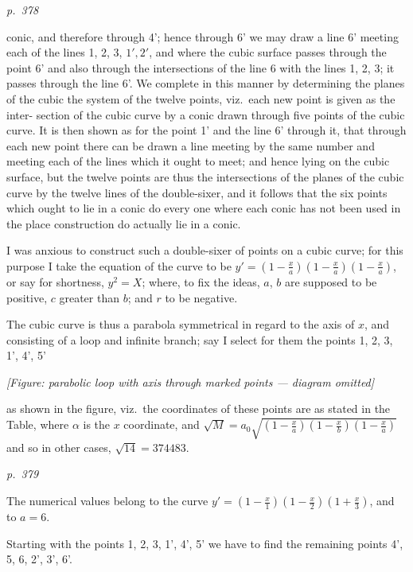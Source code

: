\documentclass[11pt,a4paper]{book}
\begin{document}
\bigskip
\textit{p.~378}
\smallskip

\noindent
conic, and therefore through 4'; hence through 6' we may draw a line 6' meeting
each of the lines 1, 2, 3, $1', 2'$, and where the cubic surface passes through the point 6'
and also through the intersections of the line 6 with the lines 1, 2, 3; it passes
through the line 6'.  We complete in this manner by determining the planes of
the cubic the system of the twelve points, viz.\ each new point is given as the inter-
section of the cubic curve by a conic drawn through five points of the cubic curve.
It is then shown as for the point 1' and the line 6' through it, that through each
new point there can be drawn a line meeting by the same number and meeting each
of the lines which it ought to meet; and hence lying on the cubic surface, but the
twelve points are thus the intersections of the planes of the cubic curve by the twelve
lines of the double-sixer, and it follows that the six points which ought to lie in
a conic do every one where each conic has not been used in the place construction
do actually lie in a conic.

I was anxious to construct such a double-sixer of points on a cubic curve; for
this purpose I take the equation of the curve to be $y' = (1 - \frac{x}{a})(1 - \frac{x}{a})(1 - \frac{x}{a})$, or
say for shortness, $y^2 = X$; where, to fix the ideas, $a$, $b$ are supposed to be positive,
$c$ greater than $b$; and $r$ to be negative.

The cubic curve is thus a parabola symmetrical in regard to the axis of $x$, and
consisting of a loop and infinite branch; say I select for them the points 1, 2, 3, 1', 4', 5'
\begin{center}
\textit{[Figure: parabolic loop with axis through marked points --- diagram omitted]}
\end{center}
as shown in the figure, viz.\ the coordinates of these points are as stated in the
Table, where $\alpha$ is the $x$ coordinate, and $\sqrt{M} = a_0 \sqrt{\left(1 - \frac{x}{a}\right)\left(1 - \frac{x}{b}\right)\left(1 - \frac{x}{a}\right)}$ and so in
other cases, $\sqrt{14} = 374483$.

\clearpage

\bigskip
\textit{p.~379}
\smallskip

\noindent
The numerical values belong to the curve $y' = \left(1 - \frac{x}{1}\right)\left(1 - \frac{x}{2}\right)\left(1 + \frac{x}{3}\right)$, and to $a = 6$.

Starting with the points 1, 2, 3, 1', 4', 5' we have to find the remaining points
4', 5, 6, 2', 3', 6'.
\end{document}
